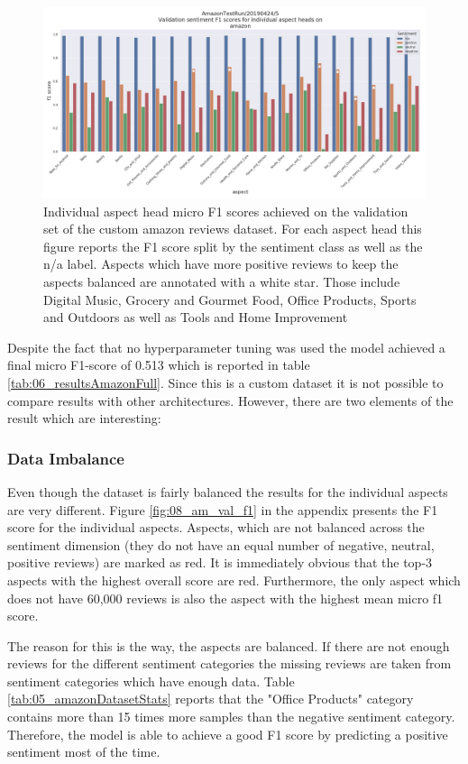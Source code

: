 \begin{figure}[htb]
	\centering
	\includegraphics[width=\textwidth]{figures/06_results/06_am_final_val_f1Sent}
	\caption{Individual aspect head micro F1 scores achieved on the validation set of the custom amazon reviews dataset. For each aspect head this figure reports the F1 score split by the sentiment class as well as the n/a label. Aspects which have more positive reviews to keep the aspects balanced are annotated with a white star. Those include Digital Music, Grocery and Gourmet Food, Office Products, Sports and Outdoors as well as Tools and Home Improvement}
	\label{fig:06_am_val_f1sent}
\end{figure}

Despite the fact that no hyperparameter tuning was used the model achieved a final micro F1-score of 0.513 which is reported in table \ref{tab:06_resultsAmazonFull}. Since this is a custom dataset it is not possible to compare results with other architectures. However, there are two elements of the result which are interesting:
\medskip

\subsubsection*{Data Imbalance}
Even though the dataset is fairly balanced the results for the individual aspects are very different. Figure \ref{fig:08_am_val_f1} in the appendix presents the F1 score for the individual aspects. Aspects, which are not balanced across the sentiment dimension {(they do not have an equal number of negative, neutral, positive reviews)} are marked as red. It is immediately obvious that the top-3 aspects with the highest overall score are red. Furthermore, the only aspect which does not have 60,000 reviews is also the aspect with the highest mean micro f1 score. 
\smallskip

The reason for this is the way, the aspects are balanced. If there are not enough reviews for the different sentiment categories the missing reviews are taken from sentiment categories which have enough data. Table \ref{tab:05_amazonDatasetStats} reports that the "Office Products" category contains more than 15 times more samples than the negative sentiment category. Therefore, the model is able to achieve a good F1 score by predicting a positive sentiment most of the time.
\smallskip


